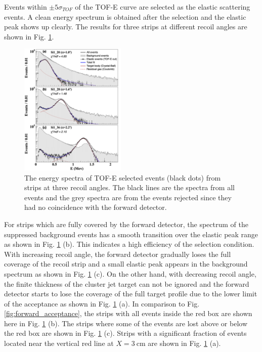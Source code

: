 \documentclass[number,5p]{elsarticle}
\begin{document}
Events within $\pm 5\sigma_{TOF}$ of the TOF-E curve are selected as the elastic
scattering events.
A clean energy spectrum is obtained after the selection and the elastic peak shows up clearly.
The results for three strips at different recoil angles are shown in Fig. \ref{fig:cut}.
\begin{figure}[tb!]
  \centering
  \includegraphics[width=0.45\textwidth]{./tofe_cut_comparison.png}
  \caption{The energy spectra of TOF-E selected events (black dots) from strips at three recoil angles. The black lines are the spectra from all events and the grey spectra are from the events rejected since they had no coincidence with the forward detector.}
  \label{fig:cut}
\end{figure}
For strips which are fully covered by the forward detector, the spectrum of the
suppressed background events has a smooth transition over the elastic peak range
as shown in Fig. \ref{fig:cut} (b).
This indicates a high efficiency of the selection condition.
With increasing recoil angle, the forward detector gradually loses the full coverage
of the recoil strip and a small elastic peak appears in the background spectrum
as shown in Fig. \ref{fig:cut} (c).
On the other hand, with decreasing recoil angle, the finite thickness of the
cluster jet target can not be ignored and the forward detector starts to lose the coverage of the full target profile due
to the lower limit of the acceptance as shown in Fig. \ref{fig:cut} (a).
In comparison to Fig. \ref{fig:forward_acceptance}, the strips with all events
inside the red box are shown here in Fig. \ref{fig:cut} (b).
The strips where some of the events are lost above or below the red box are
shown in Fig. \ref{fig:cut} (c).
Strips with a significant fraction of events located near the vertical red line
at $X = \SI{3}{\cm}$ are shown in Fig. \ref{fig:cut} (a).
\end{document}
